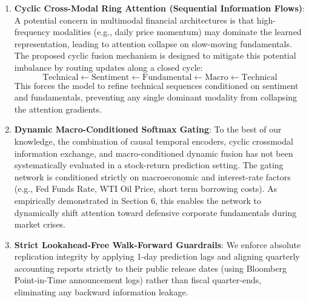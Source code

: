 \documentclass[11pt]{article}
\begin{document}
\begin{enumerate}
    \item \textbf{Cyclic Cross-Modal Ring Attention (Sequential Information Flows)}:
    A potential concern in multimodal financial architectures is that high-frequency modalities (e.g., daily price momentum) may dominate the learned representation, leading to attention collapse on slow-moving fundamentals. The proposed cyclic fusion mechanism is designed to mitigate this potential imbalance by routing updates along a closed cycle:
    \begin{equation*}
        \text{Technical} \leftarrow \text{Sentiment} \leftarrow \text{Fundamental} \leftarrow \text{Macro} \leftarrow \text{Technical}
    \end{equation*}
    This forces the model to refine technical sequences conditioned on sentiment and fundamentals, preventing any single dominant modality from collapsing the attention gradients.
    
    \item \textbf{Dynamic Macro-Conditioned Softmax Gating}:
    To the best of our knowledge, the combination of causal temporal encoders, cyclic crossmodal information exchange, and macro-conditioned dynamic fusion has not been systematically evaluated in a stock-return prediction setting. The gating network is conditioned strictly on macroeconomic and interest-rate factors (e.g., Fed Funds Rate, WTI Oil Price, short term borrowing costs). As empirically demonstrated in Section 6, this enables the network to dynamically shift attention toward defensive corporate fundamentals during market crises.
    
    \item \textbf{Strict Lookahead-Free Walk-Forward Guardrails}:
    We enforce absolute replication integrity by applying 1-day prediction lags and aligning quarterly accounting reports strictly to their public release dates (using Bloomberg Point-in-Time announcement logs) rather than fiscal quarter-ends, eliminating any backward information leakage.
\end{enumerate}
\end{document}
